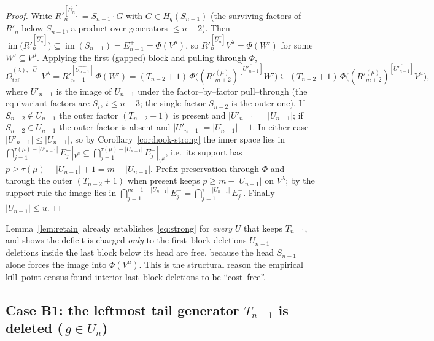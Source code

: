 \documentclass[11pt]{article}
\theoremstyle{definition}
\DeclareMathOperator{\im}{im}
\newcommand{\Vlam}{V^\lambda}
\newcommand{\Vmu}{V^\mu}
\newcommand{\Rp}{{R'}}
\newcommand{\Ep}[1]{E^{+}_{#1}}
\newcommand{\Em}[1]{E^{-}_{#1}}
\newcommand{\OmU}{\Omega^{(\lambda),[\widehat U]}_{\mathrm{tail}}}
\begin{document}
\begin{proof}
Write $\Rp_n^{[\widehat{U_n}]}=S_{n-1}\cdot G$ with $G\in H_q(S_{n-1})$ (the surviving
factors of $\Rp_n$ below $S_{n-1}$, a product over generators $\le n-2$). Then
$\im\big(\Rp_n^{[\widehat{U_n}]}\big)\subseteq\im(S_{n-1})=\Ep{n-1}=\Phi(\Vmu)$, so
$\Rp_n^{[\widehat{U_n}]}\Vlam=\Phi(W')$ for some $W'\subseteq\Vmu$. Applying the
first (gapped) block and pulling through $\Phi$,
\[
   \OmU{}\Vlam
   =\Rp_{n-1}^{[\widehat{U_{n-1}}]}\,\Phi(W')
   =(T_{n-2}+1)\,\Phi\!\big((\Rp^{(\mu)}_{m+2})^{[\widehat{U'_{n-1}}]}W'\big)
   \subseteq(T_{n-2}+1)\,\Phi\!\big((\Rp^{(\mu)}_{m+2})^{[\widehat{U'_{n-1}}]}\Vmu\big),
\]
where $U'_{n-1}$ is the image of $U_{n-1}$ under the factor--by--factor pull--through
(the equivariant factors are $S_i$, $i\le n-3$; the single factor $S_{n-2}$ is the outer
one). If $S_{n-2}\notin U_{n-1}$ the outer factor $(T_{n-2}+1)$ is present and
$|U'_{n-1}|=|U_{n-1}|$; if $S_{n-2}\in U_{n-1}$ the outer factor is absent and
$|U'_{n-1}|=|U_{n-1}|-1$. In either case $|U'_{n-1}|\le|U_{n-1}|$, so by
Corollary~\ref{cor:hook-strong} the inner space lies in
$\bigcap_{j=1}^{\tau(\mu)-|U'_{n-1}|}\Em j|_{\Vmu}\subseteq
\bigcap_{j=1}^{\tau(\mu)-|U_{n-1}|}\Em j|_{\Vmu}$, i.e.\ its support has $p\ge
\tau(\mu)-|U_{n-1}|+1=m-|U_{n-1}|$. Prefix preservation through $\Phi$ and through the
outer $(T_{n-2}+1)$ when present keeps $p\ge m-|U_{n-1}|$ on $\Vlam$; by the support rule
the image lies in
$\bigcap_{j=1}^{m-1-|U_{n-1}|}\Em j=\bigcap_{j=1}^{\tau-|U_{n-1}|}\Em j$. Finally
$|U_{n-1}|\le u$.
\end{proof}

Lemma~\ref{lem:retain} already establishes~\eqref{eq:strong} for \emph{every} $U$ that
keeps $T_{n-1}$, and shows the deficit is charged \emph{only} to the first--block deletions
$U_{n-1}$ --- deletions inside the last block below its head are free, because the head
$S_{n-1}$ alone forces the image into $\Phi(\Vmu)$. This is the structural reason the
empirical kill--point census found interior last--block deletions to be ``cost--free''.

\subsection*{Case B1: the leftmost tail generator $T_{n-1}$ is deleted ($\,g\in U_n$)}
\end{document}
